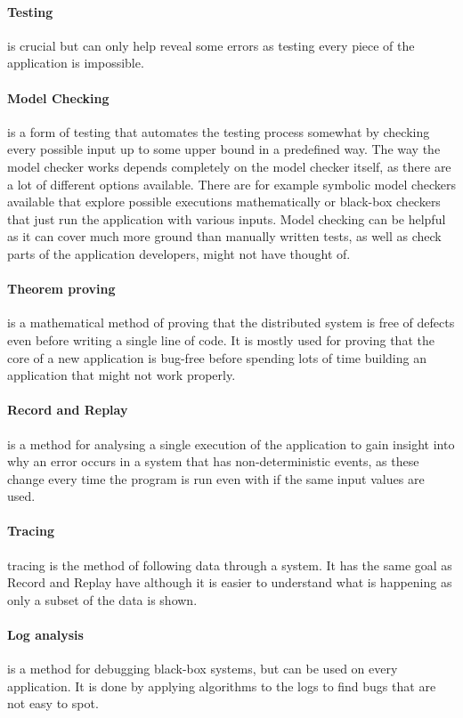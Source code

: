 \paragraph{Testing} is crucial but can only help reveal some errors as testing every piece of the application is impossible.

\paragraph{Model Checking} is a form of testing that automates the testing process somewhat by checking every possible input up to some upper bound in a predefined way. The way the model checker works depends completely on the model checker itself, as there are a lot of different options available. There are for example symbolic model checkers available that explore possible executions mathematically or black-box checkers that just run the application with various inputs. Model checking can be helpful as it can cover much more ground than manually written tests, as well as check parts of the application developers, might not have thought of.

\paragraph{Theorem proving} is a mathematical method of proving that the distributed system is free of defects even before writing a single line of code. It is mostly used for proving that the core of a new application is bug-free before spending lots of time building an application that might not work properly.

\paragraph{Record and Replay} is a method for analysing a single execution of the application to gain insight into why an error occurs in a system that has non-deterministic events, as these change every time the program is run even with if the same input values are used.

\paragraph{Tracing} tracing is the method of following data through a system. It has the same goal as Record and Replay have although it is easier to understand what is happening as only a subset of the data is shown.

\paragraph{Log analysis} is a method for debugging black-box systems, but can be used on every application. It is done by applying algorithms to the logs to find bugs that are not easy to spot.

